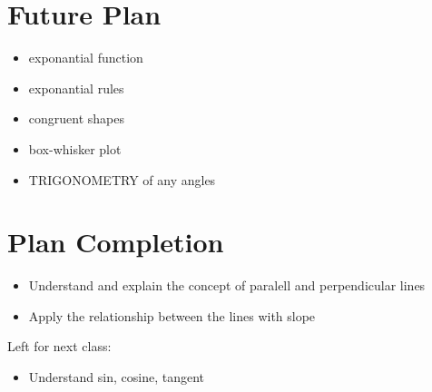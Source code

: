 \documentclass[12pt]{article}
\begin{document}
\section{Future Plan}
\begin{itemize}
    \item exponantial function
    \item exponantial rules
    \item congruent shapes
    \item box-whisker plot
    \item TRIGONOMETRY of any angles

\end{itemize}
\section{Plan Completion}
\begin{itemize}
    \item Understand and explain the concept of paralell and perpendicular lines
    \item Apply the relationship between the lines with slope
\end{itemize}
Left for next class: 
\begin{itemize}
    \item Understand sin, cosine, tangent
\end{itemize}
\end{document}
